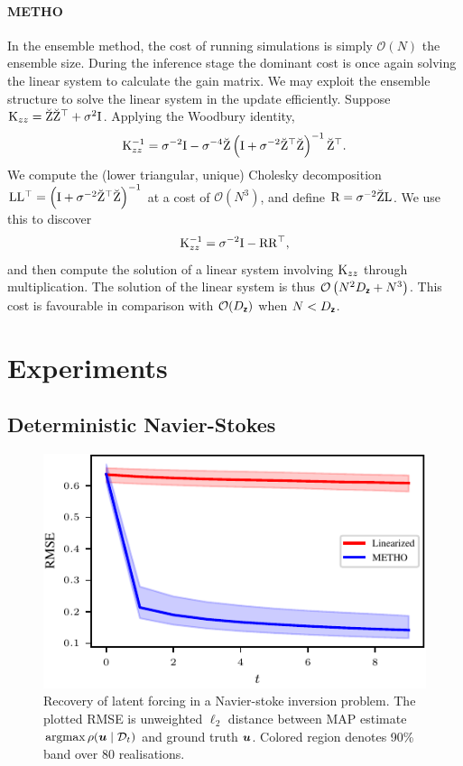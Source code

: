 \documentclass{article}
\theoremstyle{plain}
\theoremstyle{definition}
\theoremstyle{remark}
\begin{document}
\paragraph{\textbf{METHO}} In the ensemble method, the cost of running simulations is simply \(\mathcal{O}\left(N\right)\) the ensemble size.
During the inference stage the dominant cost is once again solving the linear system to calculate the gain matrix.
We may exploit the ensemble structure to solve the linear system in the update efficiently.
Suppose \(\mathrm{K}_{zz}=\breve{\mathrm{Z}} \breve{\mathrm{Z}}^{\top}+\sigma^2\mathrm{I}\).
Applying the Woodbury identity,
\begin{align*}
\mathrm{K}_{zz}^{-1}=\sigma^{-2}\mathrm{I}-\sigma^{-4} \breve{\mathrm{Z}}\left(\mathrm{I}+\sigma^{-2}\breve{\mathrm{Z}}^{\top}  \breve{\mathrm{Z}}\right)^{-1} \breve{\mathrm{Z}}^{\top}.
\end{align*}
We compute the (lower triangular, unique) Cholesky decomposition \(\mathrm{L} \mathrm{L}^{\top}=\left(\mathrm{I}+\sigma^{-2}\breve{\mathrm{Z}}^{\top} \breve{\mathrm{Z}}\right)^{-1}\) at a cost of $\mathcal{O}(N^3)$, and define \(\mathrm{R}=\sigma^{-2}\breve{\mathrm{Z}} \mathrm{L}\).
We use this to discover
\[
\mathrm{K}_{zz}^{-1}=\sigma^{-2}\mathrm{I}-\mathrm{R} \mathrm{R}^{\top},
\]
and then compute the solution of a linear system involving $\mathrm{K}_{zz}$ through multiplication.
The solution of the linear system is thus \(\mathcal{O}\left(N^2 D_{\boldsymbol{\mathsf{z}}}+N^3\right)\).
This cost is favourable in comparison with $\mathcal{O}(D_{\boldsymbol{\mathsf{z}}})$ when $N < D_{\boldsymbol{\mathsf{z}}}$.

\section{Experiments}


\subsection{Deterministic Navier-Stokes}
\begin{figure}[h!t]
    \centering
    \includegraphics[scale=1]{linear_vs_metho_large.pdf}
    \centering
    \caption{Recovery of latent forcing in a Navier-stoke inversion problem. The plotted RMSE is unweighted \(\ell_2\) distance between MAP estimate \(\operatorname{arg max} \rho(\boldsymbol{u} \mid \mathcal{D}_t)\) and ground truth \(\boldsymbol{u}\). Colored region denotes 90\% band over 80 realisations.}
    \label{fig:linear_vs_metho}
\end{figure}
\end{document}
